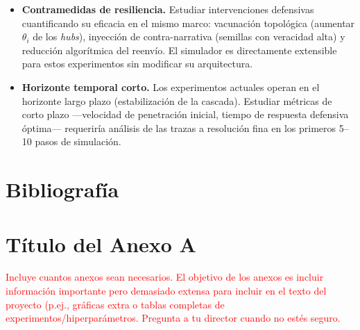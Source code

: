 \documentclass[12pt]{extarticle}
\numberwithin{equation}{section}
\begin{document}
\begin{refsection}
\begin{itemize}
    \item \textbf{Contramedidas de resiliencia.} Estudiar intervenciones defensivas cuantificando su eficacia en el mismo marco: vacunación topológica (aumentar $\theta_i$ de los \emph{hubs}), inyección de contra-narrativa (semillas con veracidad alta) y reducción algorítmica del reenvío. El simulador es directamente extensible para estos experimentos sin modificar su arquitectura.

    \item \textbf{Horizonte temporal corto.} Los experimentos actuales operan en el horizonte largo plazo (estabilización de la cascada). Estudiar métricas de corto plazo ---velocidad de penetración inicial, tiempo de respuesta defensiva óptima--- requeriría análisis de las trazas a resolución fina en los primeros 5--10 pasos de simulación.
\end{itemize}

\newpage

\section{Bibliograf\'ia} \label{sec:bibliography}

\printbibliography[heading=none]

\end{refsection}
\newpage

\appendix
\section{T\'itulo del Anexo A}
\textcolor{red}{Incluye cuantos anexos sean necesarios. El objetivo de los anexos es incluir informaci\'on importante pero demasiado extensa para incluir en el texto del proyecto (p.ej., gr\'aficas extra o tablas completas de experimentos/hiperpar\'ametros. Pregunta a tu director cuando no est\'es seguro.}
\end{document}
